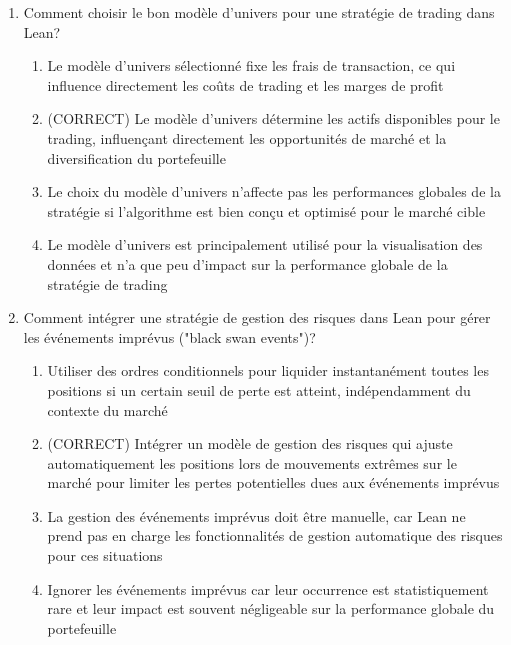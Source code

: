 \documentclass[a4paper,12pt]{article}
\begin{document}
\begin{enumerate}
    \item Comment choisir le bon modèle d'univers pour une stratégie de trading dans Lean?
    \begin{enumerate}[label=(\Alph*)]
        \item Le modèle d'univers sélectionné fixe les frais de transaction, ce qui influence directement les coûts de trading et les marges de profit
        \item (CORRECT) Le modèle d'univers détermine les actifs disponibles pour le trading, influençant directement les opportunités de marché et la diversification du portefeuille
        \item Le choix du modèle d'univers n'affecte pas les performances globales de la stratégie si l'algorithme est bien conçu et optimisé pour le marché cible
        \item Le modèle d'univers est principalement utilisé pour la visualisation des données et n'a que peu d'impact sur la performance globale de la stratégie de trading
    \end{enumerate}

    \item Comment intégrer une stratégie de gestion des risques dans Lean pour gérer les événements imprévus ("black swan events")?
    \begin{enumerate}[label=(\Alph*)]
        \item Utiliser des ordres conditionnels pour liquider instantanément toutes les positions si un certain seuil de perte est atteint, indépendamment du contexte du marché
        \item (CORRECT) Intégrer un modèle de gestion des risques qui ajuste automatiquement les positions lors de mouvements extrêmes sur le marché pour limiter les pertes potentielles dues aux événements imprévus
        \item La gestion des événements imprévus doit être manuelle, car Lean ne prend pas en charge les fonctionnalités de gestion automatique des risques pour ces situations
        \item Ignorer les événements imprévus car leur occurrence est statistiquement rare et leur impact est souvent négligeable sur la performance globale du portefeuille
    \end{enumerate}
\end{enumerate}
\end{document}
